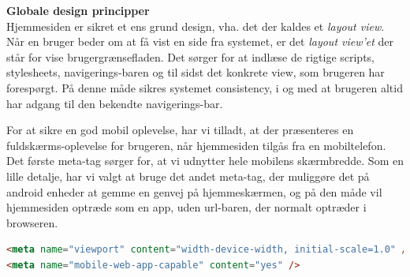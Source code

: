 \textbf{Globale design principper}\hfill\\
Hjemmesiden er sikret et ens grund design, vha. det der kaldes et \textit{layout view}.
Når en bruger beder om at få vist en side fra systemet, er det \textit{layout view'et} der står for vise  brugergrænsefladen.
Det sørger for at indlæse de rigtige scripts, stylesheets, navigerings-baren og til sidst det konkrete view, som brugeren har forespørgt.
På denne måde sikres systemet consistency, i og med at brugeren altid har adgang til den bekendte navigerings-bar.

For at sikre en god mobil oplevelse, har vi tilladt, at der præsenteres en fuldskærms-oplevelse for brugeren, når hjemmesiden tilgås fra en mobiltelefon.
Det første meta-tag sørger for, at vi udnytter hele mobilens skærmbredde.
Som en lille detalje, har vi valgt at bruge det andet meta-tag, der muliggøre det på android enheder at gemme en genvej på hjemmeskærmen, og på den måde vil hjemmesiden optræde som en app, uden url-baren, der normalt optræder i browseren.
\begin{lstlisting}[language=HTML]
<meta name="viewport" content="width-device-width, initial-scale=1.0" />
<meta name="mobile-web-app-capable" content="yes" />
\end{lstlisting}

